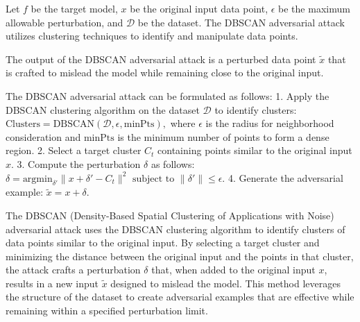 Let \( f \) be the target model, \( x \) be the original input data point, \( \epsilon \) be the maximum allowable perturbation, and \( \mathcal{D} \) be the dataset. The DBSCAN adversarial attack utilizes clustering techniques to identify and manipulate data points.

The output of the DBSCAN adversarial attack is a perturbed data point \( \tilde{x} \) that is crafted to mislead the model while remaining close to the original input.

The DBSCAN adversarial attack can be formulated as follows:
1. Apply the DBSCAN clustering algorithm on the dataset \( \mathcal{D} \) to identify clusters:
   $
   \text{Clusters} = \text{DBSCAN}(\mathcal{D}, \epsilon, \text{minPts}),
   $
   where \( \epsilon \) is the radius for neighborhood consideration and \( \text{minPts} \) is the minimum number of points to form a dense region.
2. Select a target cluster \( C_t \) containing points similar to the original input \( x \).
3. Compute the perturbation \( \delta \) as follows:
   $
   \delta = \text{argmin}_{\delta'} \| x + \delta' - C_t \|^2 \text{ subject to } \|\delta'\| \leq \epsilon.
   $
4. Generate the adversarial example:
   $
   \tilde{x} = x + \delta.
   $

The DBSCAN (Density-Based Spatial Clustering of Applications with Noise) adversarial attack uses the DBSCAN clustering algorithm to identify clusters of data points similar to the original input. By selecting a target cluster and minimizing the distance between the original input and the points in that cluster, the attack crafts a perturbation \( \delta \) that, when added to the original input \( x \), results in a new input \( \tilde{x} \) designed to mislead the model. This method leverages the structure of the dataset to create adversarial examples that are effective while remaining within a specified perturbation limit.

